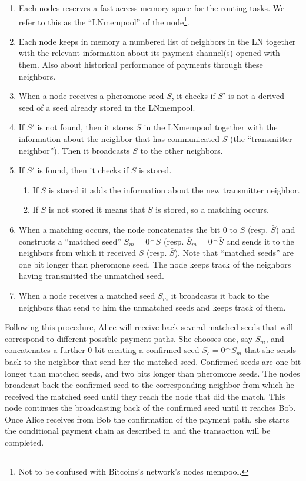 \documentclass[12pt]{amsart}
\theoremstyle{remark}
\begin{document}
\begin{enumerate}
 \item Each nodes reserves a fast access memory space for the routing tasks. 
 We refer to this as the ``LNmempool'' of the node\footnote{Not to be confused with Bitcoins's network's nodes mempool.}.
 \item Each node keeps in memory a numbered list of neighbors in the LN together with the relevant 
 information about its payment channel(s) opened with them. Also about historical performance of payments 
 through these neighbors.
 \item When a node receives a pheromone seed $S$, it checks if $S'$ is not a derived seed of a 
 seed already stored in the LNmempool.
 \item If $S'$ is not found, then it stores $S$ in the LNmempool together with the information 
 about the neighbor that has communicated $S$ (the ``transmitter neighbor''). 
 Then it broadcasts $S$ to the other neighbors.
 \item  If $S'$ is found, then it checks if $S$ is stored. 
 \begin{enumerate}
 \item If $S$ is stored it adds the information about the new transmitter neighbor.
 \item If $S$ is not stored it means that $\bar S$ is stored, so a matching occurs.
 \end{enumerate}
 \item  When a matching occurs, the node concatenates the bit $0$ to $S$ (resp. $\bar S$) and 
 constructs a ``matched seed'' $S_m= 0^\frown S$ (resp. $\bar S_m= 0^\frown \bar S$ 
 and sends it to the neighbors from which it received $S$ (resp. $\bar S$). 
 Note that ``matched seeds'' are one bit longer 
 than pheromone seed. The node keeps track of the neighbors having transmitted the unmatched seed. 
 \item When a node receives a matched seed $S_m$ it broadcasts it back to the 
 neighbors that send to him the unmatched seeds and keeps track of them. 
\end{enumerate}

Following this procedure, Alice will receive back several matched seeds that will correspond 
to different possible payment paths. She chooses one, say $S_m$, and concatenates 
a further $0$ bit creating a confirmed seed $S_c=0^\frown S_m$ that she sends back to 
the neighbor that send her the matched seed. Confirmed seeds are one bit longer than matched seeds, and two bits
longer than pheromone seeds. The nodes broadcast back the confirmed seed to the 
corresponding neighbor from which he received the matched seed until they reach the node that 
did the match. This node continues the broadcasting back of the confirmed seed until it reaches Bob. 
Once Alice receives from Bob the confirmation of the payment path, she starts the conditional payment chain as described 
in \cite{PD15} and the transaction will be completed.
\end{document}
